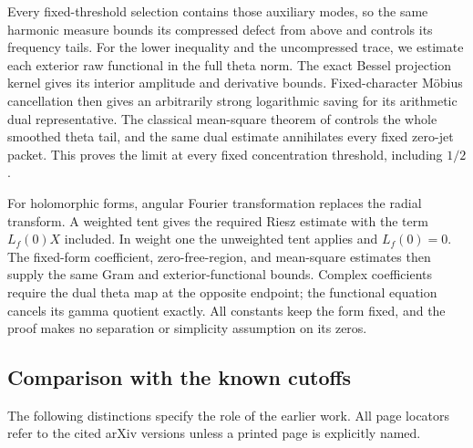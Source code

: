 Every fixed-threshold selection contains those auxiliary modes, so
the same harmonic measure bounds its compressed defect from above
and controls its frequency tails. For the lower inequality and the
uncompressed trace, we estimate each exterior raw functional in the
full theta norm. The exact Bessel projection kernel gives its interior
amplitude and derivative bounds. Fixed-character M\"obius cancellation
then gives an arbitrarily strong logarithmic saving for its arithmetic
dual representative. The classical mean-square theorem of
\citet[Theorem~1, printed p.~62]{chandrasekharannar1964}
controls the whole smoothed theta tail, and the same dual estimate
annihilates every fixed zero-jet packet. This proves the limit at
every fixed concentration threshold, including $1/2$.

For holomorphic forms, angular Fourier transformation replaces
the radial transform. A weighted tent gives the required Riesz
estimate with the term $L_f(0)X$ included. In weight one the
unweighted tent applies and $L_f(0)=0$. The fixed-form coefficient,
zero-free-region, and mean-square estimates then supply the same
Gram and exterior-functional bounds. Complex coefficients require
the dual theta map at the opposite endpoint; the functional
equation cancels its gamma quotient exactly. All constants keep
the form fixed, and the proof makes no separation or simplicity
assumption on its zeros.

\subsection{Comparison with the known cutoffs}
The following distinctions specify the role of the earlier work.
All page locators refer to the cited arXiv versions unless a printed
page is explicitly named.

